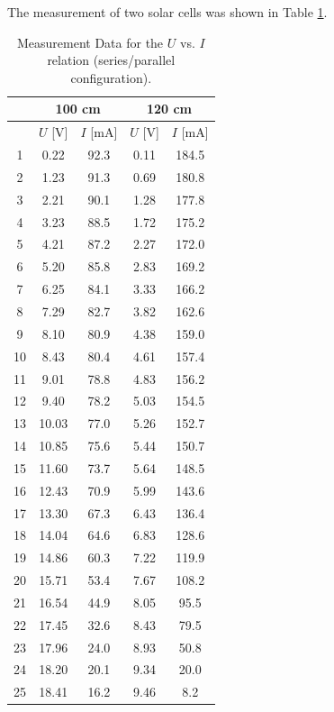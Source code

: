 \newpage

The measurement of two solar cells was shown in Table \ref{tab-6}.\\

\begin{table}[!h]
\begin{center}
\begin{tabular}{|c|c|c|c|c|}
\hline
&\multicolumn{2}{|c|}{100 cm}&\multicolumn{2}{|c|}{120 cm}\\
\hline
& $U$ [V] & $I$ [mA] & $U$ [V] & $I$ [mA] \\
\hline
1	&	0.22	&	92.3	&	0.11	&	184.5	\\
\hline
2	&	1.23	&	91.3	&	0.69	&	180.8	\\
\hline
3	&	2.21	&	90.1	&	1.28	&	177.8	\\
\hline
4	&	3.23	&	88.5	&	1.72	&	175.2	\\
\hline
5	&	4.21	&	87.2	&	2.27	&	172.0	\\
\hline
6	&	5.20	&	85.8	&	2.83	&	169.2	\\
\hline
7	&	6.25	&	84.1	&	3.33	&	166.2	\\
\hline
8	&	7.29	&	82.7	&	3.82	&	162.6	\\
\hline
9	&	8.10	&	80.9	&	4.38	&	159.0	\\
\hline
10	&	8.43	&	80.4	&	4.61	&	157.4	\\
\hline
11	&	9.01	&	78.8	&	4.83	&	156.2	\\
\hline
12	&	9.40	&	78.2	&	5.03	&	154.5	\\
\hline
13	&	10.03	&	77.0	&	5.26	&	152.7	\\
\hline
14	&	10.85	&	75.6	&	5.44	&	150.7	\\
\hline
15	&	11.60	&	73.7	&	5.64	&	148.5	\\
\hline
16	&	12.43	&	70.9	&	5.99	&	143.6	\\
\hline
17	&	13.30	&	67.3	&	6.43	&	136.4	\\
\hline
18	&	14.04	&	64.6	&	6.83	&	128.6	\\
\hline
19	&	14.86	&	60.3	&	7.22	&	119.9	\\
\hline
20	&	15.71	&	53.4	&	7.67	&	108.2	\\
\hline
21	&	16.54	&	44.9	&	8.05	&	95.5	\\
\hline
22	&	17.45	&	32.6	&	8.43	&	79.5	\\
\hline
23	&	17.96	&	24.0	&	8.93	&	50.8	\\
\hline
24	&	18.20	&	20.1	&	9.34	&	20.0	\\
\hline
25	&	18.41	&	16.2	&	9.46	&	8.2	\\
\hline
\end{tabular}
\caption{Measurement Data for the $U$ vs. $I$ relation (series/parallel configuration).}
\label{tab-6}
\end{center}
\end{table}

